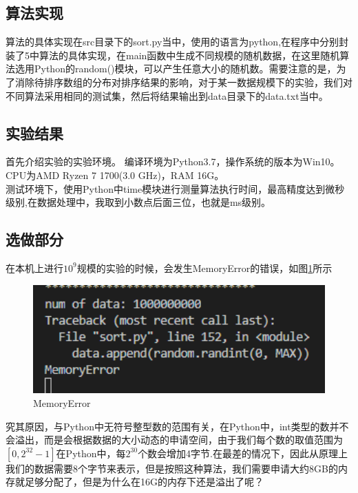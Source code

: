 \documentclass[UTF8]{ctexart}
\begin{document}
\subsection{算法实现}

算法的具体实现在src目录下的sort.py当中，使用的语言为python,在程序中分别封装了5中算法的具体实现，在main函数中生成不同规模的随机数据，在这里随机算法选用Python的random()模块，可以产生任意大小的随机数。需要注意的是，为了消除待排序数组的分布对排序结果的影响，对于某一数据规模下的实验，我们对不同算法采用相同的测试集，然后将结果输出到data目录下的data.txt当中。

\subsection{实验结果}
首先介绍实验的实验环境。
编译环境为Python3.7，操作系统的版本为Win10。
CPU为AMD Ryzen 7 1700(3.0 GHz)，RAM 16G。\\
测试环境下，使用Python中time模块进行测量算法执行时间，最高精度达到微秒级别,在数据处理中，我取到小数点后面三位，也就是ms级别。\\


\subsection{选做部分}

在本机上进行$10^9$规模的实验的时候，会发生MemoryError的错误，如图\ref{error}所示\\

\begin{figure}[H]
    \centering
    \includegraphics[width=1\textwidth]{img/error.png}
    \caption{MemoryError}
    \label{error}
\end{figure}

究其原因，与Python中无符号整型数的范围有关，在Python中，int类型的数并不会溢出，而是会根据数据的大小动态的申请空间，由于我们每个数的取值范围为$[0,2^{32}-1]$在Python中，每$2^{30}$个数会增加4字节.在最差的情况下，因此从原理上我们的数据需要8个字节来表示，但是按照这种算法，我们需要申请大约8GB的内存就足够分配了，但是为什么在16G的内存下还是溢出了呢？\\
\end{document}
